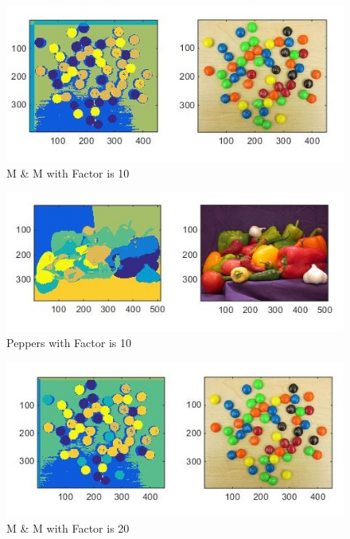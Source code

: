 \documentclass[12pt]{article}
\begin{document}
\begin{figure}[h]
    \centering
    \includegraphics[width=1\textwidth]{manmFactor10.jpg}
    \caption{M \& M with Factor is 10}
    \label{fig:manmFactor10}
\end{figure}


\begin{figure}[h]
    \centering
    \includegraphics[width=1\textwidth]{peppersFactor10New.jpg}
    \caption{Peppers with Factor is 10}
    \label{fig:peppersFactor10}
\end{figure}



\begin{figure}[h]
    \centering
    \includegraphics[width=1\textwidth]{manmFactor20.jpg}
    \caption{M \& M with Factor is 20}
    \label{fig:manmFactor20}
\end{figure}
\end{document}
